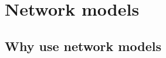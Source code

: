 \documentclass[aspectratio=43]{beamer}
\begin{document}
\section{Network models}
\subsection{Why use network models}

% 
% 
% 
% 
% 
% 
% 
% 
% 
% 
% 
\end{document}
